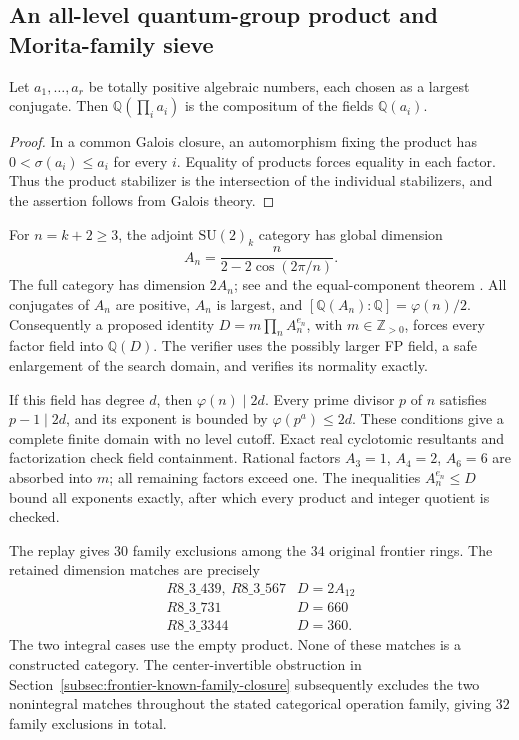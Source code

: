 \subsection{An all-level quantum-group product and Morita-family sieve}
\label{subsec:frontier-all-level-su2}

\begin{lemma}
Let $a_1,\ldots,a_r$ be totally positive algebraic numbers, each chosen
as a largest conjugate. Then
$\mathbb Q(\prod_i a_i)$ is the compositum of the fields $\mathbb Q(a_i)$.
\end{lemma}
\begin{proof}
In a common Galois closure, an automorphism fixing the product has
$0<\sigma(a_i)\le a_i$ for every $i$. Equality of products forces equality
in each factor. Thus the product stabilizer is the intersection of the
individual stabilizers, and the assertion follows from Galois theory.
\end{proof}

For $n=k+2\ge3$, the adjoint $\mathrm{SU}(2)_k$ category has global
dimension
\[
 A_n=\frac{n}{2-2\cos(2\pi/n)}.
\]
The full category has dimension $2A_n$; see
\cite[p.~8]{CoquereauxQuantumMcKay}
and the equal-component theorem \cite[Proposition~8.20]{ENO}.
All conjugates of $A_n$ are positive, $A_n$ is largest, and
$[\mathbb Q(A_n):\mathbb Q]=\varphi(n)/2$.
Consequently a proposed identity $D=m\prod_n A_n^{e_n}$, with
$m\in\mathbb Z_{>0}$, forces every factor field into $\mathbb Q(D)$.
The verifier uses the possibly larger FP field, a safe enlargement of
the search domain, and verifies its normality exactly.

If this field has degree $d$, then $\varphi(n)\mid2d$.
Every prime divisor $p$ of $n$ satisfies $p-1\mid2d$, and its exponent
is bounded by $\varphi(p^a)\le2d$. These conditions give a complete
finite domain with no level cutoff. Exact real cyclotomic resultants
and factorization check field containment. Rational factors
$A_3=1$, $A_4=2$, $A_6=6$ are absorbed into $m$; all remaining factors
exceed one. The inequalities $A_n^{e_n}\le D$ bound all exponents
exactly, after which every product and integer quotient is checked.

The replay 
gives $30$ family exclusions among the $34$ original frontier rings.
The retained dimension matches are precisely
\[
\begin{array}{c|c}
R8\_3\_439,\ R8\_3\_567&D=2A_{12}\\
R8\_3\_731&D=660\\
R8\_3\_3344&D=360.
\end{array}
\]
The two integral cases use the empty product. None of these matches
is a constructed category. The center-invertible obstruction in
Section~\ref{subsec:frontier-known-family-closure} subsequently excludes
the two nonintegral matches throughout the stated categorical operation
family, giving $32$ family exclusions in total.

